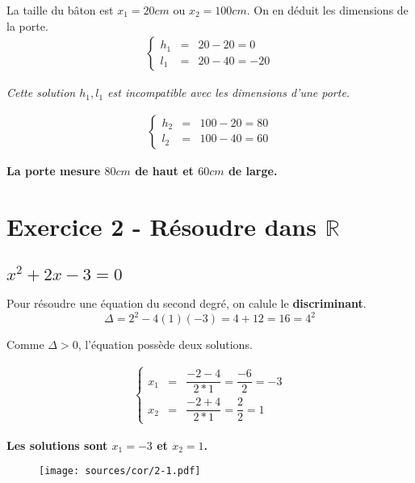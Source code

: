 \documentclass[11pt]{article}
\begin{document}
\begin{multicols}{2}
  La taille du bâton est  $x_1 = 20cm$ ou  $x_2 = 100cm$. On en déduit les dimensions de la porte. \\
  \begin{eqnarray*}
    \left\{
    \begin{aligned}
      h_1 &=& 20 - 20 = 0\\
      l_1 &=& 20-40 = -20
    \end{aligned}
    \right.
  \end{eqnarray*}

  \textit{Cette solution $h_1 , l_1$ est incompatible avec les dimensions d'une porte.}

  \begin{eqnarray*}
    \left\{
    \begin{aligned}
      h_2 &=& 100 - 20 = 80\\
      l_2 &=& 100 - 40 = 60
    \end{aligned}
    \right.
  \end{eqnarray*}
  
  \textbf{La porte mesure $80cm$ de haut et $60cm$ de large.}

\end{multicols}

\newpage


\section{Exercice 2 - Résoudre dans $\mathbb{R}$ }

\begin{multicols}{2}
\subsection{$x^2 + 2x - 3 = 0$} 
  Pour résoudre une équation du second degré, on calule le \textbf{discriminant}.
  $$\Delta = 2^2 - 4(1)(-3) = 4 + 12 = 16 = 4^2$$

  Comme $\Delta > 0$, l'équation possède deux solutions.


  \begin{eqnarray*}
    \left\{
    \begin{aligned}
      x_1 &=& \dfrac{-2 - 4}{2*1} = \dfrac{-6}{2} = -3\\
      x_2 &=& \dfrac{-2 + 4}{2*1} = \dfrac{2}{2} = 1
    \end{aligned}
    \right.
  \end{eqnarray*}

  \textbf{Les solutions sont $x_1 = -3$ et $x_2 = 1$.}

  \begin{figure}[H]
    \centering
    \texttt{[image: sources/cor/2-1.pdf]}
  \end{figure}

\end{multicols}
\end{document}
